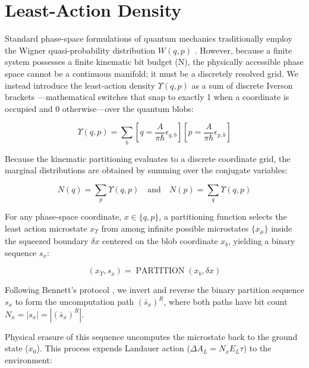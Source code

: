 \documentclass[%
  aps, reprint, prl, amsmath,amssymb
]{revtex4-2}
\begin{document}
\section{Least-Action Density}


Standard phase-space formulations of quantum mechanics traditionally employ the Wigner quasi-probability distribution $W(q,p)$ \cite{Wigner1932}. However, because a finite system possesses a finite kinematic bit budget (N), the physically accessible phase space cannot be a continuous manifold; it must be a discretely resolved grid. We instead introduce the least-action density $\Upsilon(q,p)$ as a sum of discrete Iverson brackets \cite{Knuth1992}—mathematical switches that snap to exactly 1 when a coordinate is occupied and 0 otherwise—over the quantum blobs:

\begin{equation}
\label{eq:JointErasure}
\Upsilon(q,p) = \sum_{b} \left[ q = \frac{A}{\pi \hbar} \epsilon_{q,b} \right] \left[ p = \frac{A}{\pi \hbar} \epsilon_{p,b} \right]
\end{equation}

Because the kinematic partitioning evaluates to a discrete coordinate grid, the marginal distributions are obtained by summing over the conjugate variables:

\begin{equation}
\label{eq:Marginals}
N(q) = \sum_{p} \Upsilon(q,p)
\quad \text{and} \quad
N(p) = \sum_{q} \Upsilon(q,p)
\end{equation}

For any phase-space coordinate, $x \in \{q, p\}$, a partitioning function selects the least action microstate $x_\Upsilon$ from among infinite possible microstates $\{x_\mu\}$ inside the squeezed boundary $\delta x$ centered on the blob coordinate $x_b$, yielding a binary sequence $s_x$:

\begin{equation}
\label{eq:PartitionFunction}
(x_\Upsilon, s_x) = \operatorname{PARTITION}(x_b, \delta x)
\end{equation}

Following Bennett's protocol \cite{Bennett1973}, we invert and reverse the binary partition sequence $s_x$ to form the uncomputation path $(\bar{s}_x)^R$, where both paths have bit count $N_x = |s_x| = |(\bar{s}_x)^R|$.

Physical erasure of this sequence uncomputes the microstate back to the ground state ($x_0$). This process expends Landauer action ($\Delta A_L = N_x E_L \tau$) to the environment:
\end{document}
